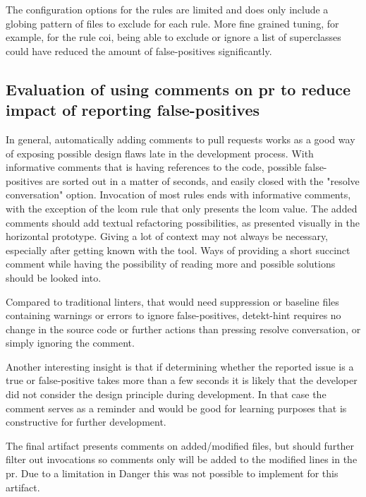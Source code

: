 \documentclass{report}
\begin{document}
The configuration options for the rules are limited and does only include a globing pattern of files to exclude for each rule. More fine grained tuning, for example, for the rule \gls{coi}, being able to exclude or ignore a list of superclasses could have reduced the amount of false-positives significantly.  


\subsection{Evaluation of using comments on \gls{pr} to reduce impact of reporting false-positives}
In general, automatically adding comments to pull requests works as a good way of exposing possible design flaws late in the development process. With informative comments that is having references to the code, possible false-positives are sorted out in a matter of seconds, and easily closed with the "resolve conversation" option. Invocation of most rules ends with informative comments, with the exception of the \gls{lcom} rule that only presents the \gls{lcom} value. The added comments should add textual refactoring possibilities, as presented visually in the horizontal prototype. Giving a lot of context may not always be necessary, especially after getting known with the tool. Ways of providing a short succinct comment while having the possibility of reading more and possible solutions should be looked into.

Compared to traditional linters, that would need suppression or baseline files containing warnings or errors to ignore false-positives, detekt-hint requires no change in the source code or further actions than pressing resolve conversation, or simply ignoring the comment.  

Another interesting insight is that if determining whether the reported issue is a true or false-positive takes more than a few seconds it is likely that the developer did not consider the design principle during development. In that case the comment serves as a reminder and would be good for learning purposes that is constructive for further development.

The final artifact presents comments on added/modified files, but should further filter out invocations so comments only will be added to the modified lines in the \gls{pr}. Due to a limitation in Danger this was not possible to implement for this artifact.



\end{document}
